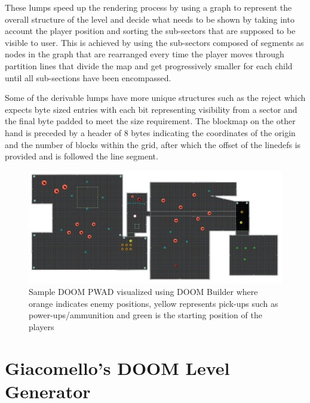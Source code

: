 \documentclass{Configuration_Files/PoliMi3i_thesis}
\begin{document}
These lumps speed up the rendering process by using a graph to represent the 
overall structure of the level and decide what needs to be shown by taking into 
account the player position and sorting the sub-sectors that are supposed to be 
visible to user. This is achieved by using the sub-sectors composed of segments as 
nodes in the graph that are rearranged every time the player moves through 
partition lines that divide the map and get progressively smaller for each child until 
all sub-sections have been encompassed.

Some of the derivable lumps have more unique structures such as the reject which 
expects byte sized entries with each bit representing visibility from a sector and the 
final byte padded to meet the size requirement. The blockmap on the other hand is 
preceded by a header of 8 bytes indicating the coordinates of the origin and the 
number of blocks within the grid, after which the offset of the linedefs is provided 
and is followed the line segment.
\begin{figure}[H]
    \centering
    \includegraphics[width=1\textwidth]{sample_doom_builder.jpg}
    \caption[Sample DOOM PWAD visualized using DOOM Builder]{Sample DOOM PWAD visualized using DOOM Builder where orange 
indicates enemy positions, yellow represents pick-ups such as power-ups/ammunition and green is the starting position of the players}
    \label{fig:doombuilder}
\end{figure}
\newpage

\section{Giacomello’s DOOM Level Generator}
\end{document}
